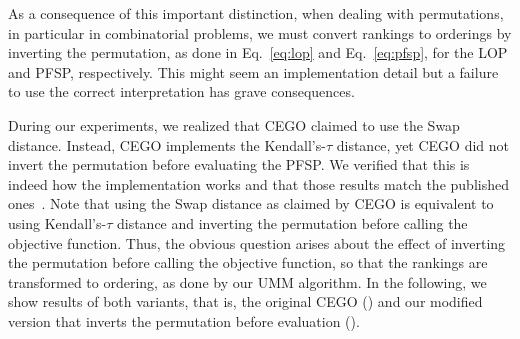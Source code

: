 \documentclass[sigconf,dvipsnames]{acmart}
\newcommand{\ken}{Kendall's-$\tau$\xspace}
\begin{document}
As a consequence of this important distinction, when dealing with  permutations, in particular in 
combinatorial problems, we must convert rankings to orderings by inverting the
permutation, as done in Eq.~\ref{eq:lop} and Eq.~\ref{eq:pfsp}, for the LOP and
PFSP, respectively. This might seem an implementation detail but a failure to use the correct interpretation has grave consequences.

During our experiments, we realized that CEGO claimed to use the Swap distance. Instead, CEGO implements the \ken distance, yet CEGO did
not invert the permutation before evaluating the PFSP.
We verified that this is
indeed how the implementation works and that those results match the published
ones~\citep{ZaeStoBar2014:ppsn}. 
Note that using the Swap distance as claimed by CEGO is equivalent to using \ken distance and inverting the permutation before calling the objective
function. Thus, the obvious question arises about the effect of inverting the permutation before calling the objective
function, so that the rankings are transformed to ordering, as done by our UMM
algorithm. In the following, we show results of both variants, that is, the original CEGO (\CEGOorig) and our modified version that inverts the permutation before evaluation (\CEGOinv).
\end{document}
